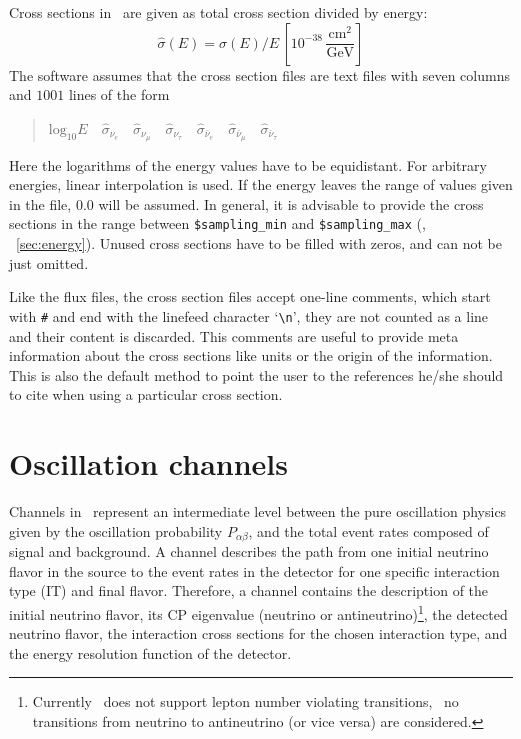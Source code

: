 Cross sections in \GLOBES\ are given as total cross section divided by energy:
\begin{equation}
\hat\sigma(E)=\sigma(E)/E\,\left[ 10^{-38}\,
\frac{\mathrm{cm}^2}{\mathrm{GeV}} \right]
\end{equation}
The software assumes that the cross section files are text files with 
seven columns and $1001$ lines of the form
\begin{quotation}
$\mathrm{log}_{10} E\quad
\hat\sigma_{\nu_e}\quad
\hat\sigma_{\nu_\mu}\quad
\hat\sigma_{\nu_\tau}\quad
\hat\sigma_{\bar\nu_e}\quad
\hat\sigma_{\bar\nu_\mu}\quad
\hat\sigma_{\bar\nu_\tau}$
\end{quotation}
Here the logarithms of the energy values have to be equidistant. For 
arbitrary energies, linear interpolation is used. If the energy leaves the
range of values given in the file, $0.0$ will be assumed. In general, it is advisable to provide the cross sections in the range between {\tt \$sampling\_min} and {\tt \$sampling\_max} (\cf, \Sec~\ref{sec:energy}).
Unused cross sections have to be filled with zeros, and can not
 be just omitted.

Like the flux files, the cross section files 
accept one-line comments, which start
with {\tt \#} and end with the linefeed character `\verb+\n+', they are
not counted as a line and their content is discarded. This comments
are useful to provide meta information about the cross sections like units
or the origin of the information. This is also the default method
to point the user to the references he/she should to cite when using
a particular cross section.

\section{Oscillation channels}
\label{sec:channel}

Channels in \GLOBES\ represent an intermediate level 
between the pure oscillation physics given by the oscillation probability
$P_{\alpha\beta}$, and the total event rates composed of signal and 
background. A channel describes the path from one
initial neutrino flavor in the source to the event rates in the detector for one specific interaction type (IT) and final flavor.  
Therefore, a channel contains the description of the 
initial neutrino flavor, its CP eigenvalue 
(neutrino or antineutrino)\footnote{Currently \GLOBES\ does not support lepton
number violating transitions, \ie\ no transitions from neutrino to 
antineutrino (or vice versa) are considered.}, 
the detected neutrino flavor, the interaction cross sections for the chosen interaction type, and the energy resolution function of the detector.

